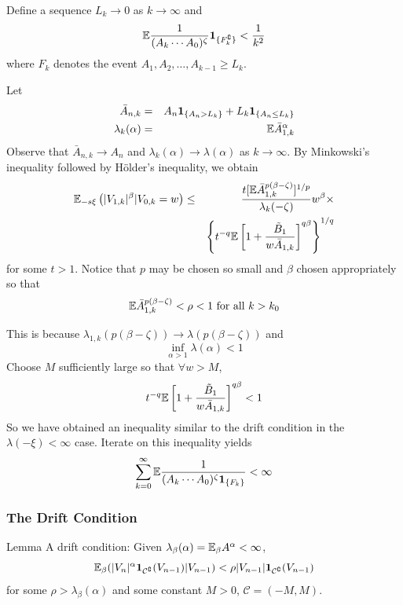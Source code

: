 \documentclass{beamer}
\begin{document}
\begin{frame}
  Define a sequence $L_k \to 0$ as $k \to \infty$ and
  \[
  \mathbb{E} {
    1 \over
    (A_k \cdots A_0)^\zeta
  }  \mathbf{1}_{\{F_k^\complement\}} < {1 \over k^2}
  \]
  where $F_k$ denotes the event $A_1, A_2, \dots, A_{k-1} \geq L_k$.
\end{frame}

\begin{frame}
  Let
  \begin{eqnarray*}
    \bar A_{n,k} &=& A_{n} \mathbf{1}_{\{A_n > L_k\}} + L_k \mathbf{1}_{\{A_n \leq L_k\}} \\
    \lambda_k(\alpha) &=& \mathbb{E} \bar A_{1,k}^\alpha
  \end{eqnarray*}
  Observe that $\bar A_{n,k} \to A_n$ and $\lambda_k(\alpha) \to
  \lambda(\alpha)$ as $k \to \infty$. By Minkowski's inequality
  followed by H\"older's inequality, we obtain
  \begin{eqnarray*}
    \mathbb{E}_{-s\xi} \left( |V_{1,k}|^\beta | V_{0,k} = w\right) &\leq& {
    t [\mathbb{E} \bar A_{1,k}^{p(\beta - \zeta)}]^{1/p}
    \over
    \lambda_k(-\zeta)
  } w^\beta \times \\
  && \left\{
    t^{-q} \mathbb{E} \left[
      1 + {
        \tilde B_1
        \over
        w \bar A_{1,k}
      }
    \right]^{q\beta}
  \right\}^{1/q}
  \end{eqnarray*}
  for some $t > 1$. Notice that $p$ may be chosen so small and $\beta$
  chosen appropriately so that
  \[
  \mathbb{E} \bar A_{1,k}^{p(\beta - \zeta)} < \rho < 1 \text{ for all } k > k_0
  \]
\end{frame}

\begin{frame}
  This is because $\lambda_{1,k}(p(\beta - \zeta)) \to \lambda(p(\beta
  - \zeta))$ and
  \[
  \inf_{\alpha > 1} \lambda(\alpha) < 1
  \]
  Choose $M$ sufficiently large so that $\forall w > M$,
  \[
    t^{-q} \mathbb{E} \left[
      1 + {
        \tilde B_1
        \over
        w \bar A_{1,k}
      }
    \right]^{q\beta} < 1
  \]
  So we have obtained an inequality similar to the drift condition in
  the $\lambda(-\xi) < \infty$ case. Iterate on this inequality yields
  \[
  \sum_{k=0}^\infty \mathbb{E} {
    1 \over
    (A_k \cdots A_0)^\zeta \mathbf{1}_{\{F_k\}}
  } < \infty
  \]

\end{frame}

\begin{frame}
  \frametitle{The Drift Condition}
  \begin{block}{Lemma}
    A drift condition: Given $\lambda_\beta(\alpha) = \mathbb{E}_\beta
    A^\alpha < \infty$,
    \[
    \mathbb{E}_\beta (|V_n|^\alpha \mathbf{1}_{\mathcal C^\complement}(V_{n-1}) |
    V_{n-1}) < \rho |V_{n-1}|\mathbf{1}_{\mathcal C^\complement}(V_{n-1})
    \]
    for some $\rho > \lambda_\beta(\alpha)$ and some constant $M > 0$,
    $\mathcal C = (-M, M)$.
  \end{block}
\end{frame}
\end{document}
